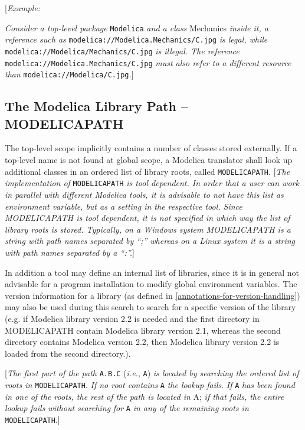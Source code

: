 {[}\emph{Example:}

\emph{Consider a top-level package} \lstinline[basicstyle=\ttfamily]!Modelica! \emph{and a class}
Mechanics \emph{inside it, a reference such as}
\lstinline[basicstyle=\ttfamily]!modelica://Modelica.Mechanics/C.jpg! \emph{is legal, while}
\lstinline[basicstyle=\ttfamily]!modelica://Modelica/Mechanics/C.jpg! \emph{is illegal. The reference}
\lstinline[basicstyle=\ttfamily]!modelica://Modelica.Mechanics/C.jpg! \emph{must also refer to a different
resource than} \lstinline[basicstyle=\ttfamily]!modelica://Modelica/C.jpg!\emph{.}{]}

\subsection{The Modelica Library Path -- MODELICAPATH}

The top-level scope implicitly contains a number of classes stored
externally. If a top-level name is not found at global scope, a Modelica
translator shall look up additional classes in an ordered list of
library roots, called \lstinline[basicstyle=\ttfamily]!MODELICAPATH!. {[}\emph{The implementation of}
\lstinline[basicstyle=\ttfamily]!MODELICAPATH! \emph{is tool dependent. In order that a user can work in
parallel with different Modelica tools, it is advisable to not have this
list as environment variable, but as a setting in the respective tool.
Since MODELICAPATH is tool dependent, it is not specified in which way
the list of library roots is stored. Typically, on a Windows system
MODELICAPATH is a string with path names separated by ``;'' whereas on a
Linux system it is a string with path names separated by a ``:''.}{]}

In addition a tool may define an internal list of libraries, since it is
in general not advisable for a program installation to modify global
environment variables. The version information for a library (as defined
in \autoref{annotations-for-version-handling}) may also be used during this search to search for a
specific version of the library (e.g. if Modelica library version 2.2 is
needed and the first directory in MODELICAPATH contain Modelica library
version 2.1, whereas the second directory contains Modelica version 2.2,
then Modelica library version 2.2 is loaded from the second directory.).

{[}\emph{The first part of the path} \lstinline[basicstyle=\ttfamily]!A.B.C! (\emph{i.e.}, \lstinline[basicstyle=\ttfamily]!A!) \emph{is
located by searching the ordered list of roots in} \lstinline[basicstyle=\ttfamily]!MODELICAPATH!.
\emph{If no root contains} \lstinline[basicstyle=\ttfamily]!A! \emph{the lookup fails}. \emph{If} \lstinline[basicstyle=\ttfamily]!A!
\emph{has been found in one of the roots, the rest of the path is
located in} A; \emph{if that fails, the entire lookup fails without
searching} \emph{for} \lstinline[basicstyle=\ttfamily]!A! \emph{in any of the remaining roots in}
\lstinline[basicstyle=\ttfamily]!MODELICAPATH!.{]}

